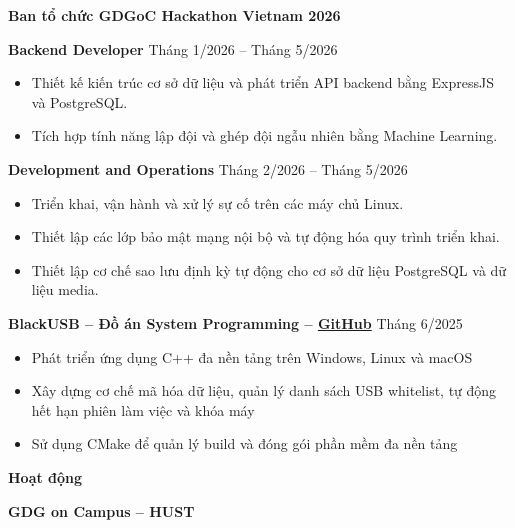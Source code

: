\documentclass[11pt]{article}
\begin{document}
\vspace{12pt}

\textbf{Ban tổ chức GDGoC Hackathon Vietnam 2026}

\textbf{Backend Developer} \hfill Tháng 1/2026 -- Tháng 5/2026
\begin{itemize}[noitemsep, topsep=0pt, partopsep=0pt, parsep=0pt]
    \item Thiết kế kiến trúc cơ sở dữ liệu và phát triển API backend bằng ExpressJS và PostgreSQL.
    \item Tích hợp tính năng lập đội và ghép đội ngẫu nhiên bằng Machine Learning.
\end{itemize}

\vspace{12pt}

\textbf{Development and Operations} \hfill Tháng 2/2026 -- Tháng 5/2026
\begin{itemize}[noitemsep, topsep=0pt, partopsep=0pt, parsep=0pt]
    \item Triển khai, vận hành và xử lý sự cố trên các máy chủ Linux.
    \item Thiết lập các lớp bảo mật mạng nội bộ và tự động hóa quy trình triển khai.
    \item Thiết lập cơ chế sao lưu định kỳ tự động cho cơ sở dữ liệu PostgreSQL và dữ liệu media.
\end{itemize}

\vspace{12pt}

\textbf{BlackUSB -- Đồ án System Programming -- \href{https://github.com/ngqtrung2217/BlackUSB}{GitHub}} \hfill Tháng 6/2025
\begin{itemize}[noitemsep, topsep=0pt, partopsep=0pt, parsep=0pt]
    \item Phát triển ứng dụng C++ đa nền tảng trên Windows, Linux và macOS
    \item Xây dựng cơ chế mã hóa dữ liệu, quản lý danh sách USB whitelist, tự động hết hạn phiên làm việc và khóa máy
    \item Sử dụng CMake để quản lý build và đóng gói phần mềm đa nền tảng
\end{itemize}

\vspace{12pt}

\begin{center}
    \textbf{Hoạt động}
\end{center}

\textbf{GDG on Campus -- HUST}
\end{document}
